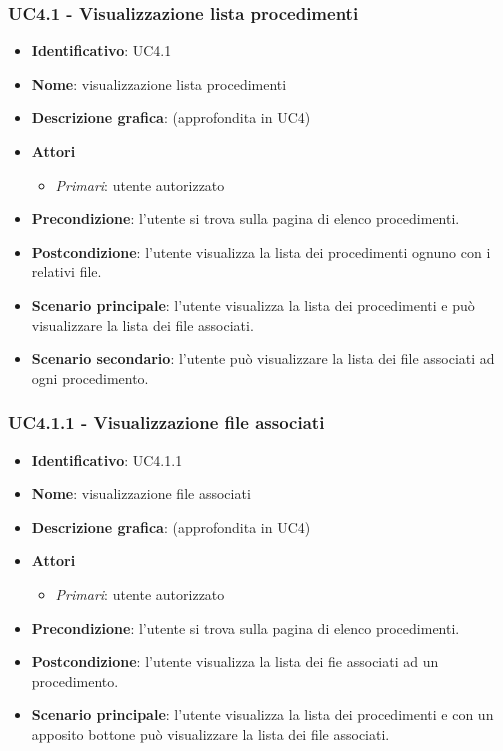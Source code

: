 \subsubsection{UC4.1 - Visualizzazione lista procedimenti}
\begin{itemize}
  \item \textbf{Identificativo}: UC4.1
  \item \textbf{Nome}: visualizzazione lista procedimenti
  \item \textbf{Descrizione grafica}: (approfondita in UC4)
  \item \textbf{Attori}
        \begin{itemize}
          \item \textit{Primari}: utente autorizzato
        \end{itemize}
  \item \textbf{Precondizione}: l'utente si trova sulla pagina di elenco procedimenti.
  \item \textbf{Postcondizione}: l'utente visualizza la lista dei procedimenti ognuno con i relativi file.
  \item \textbf{Scenario principale}: l'utente visualizza la lista dei procedimenti e può visualizzare la lista dei file associati.
  \item \textbf{Scenario secondario}: l'utente può visualizzare la lista dei file associati ad ogni procedimento.
\end{itemize}

\subsubsection{UC4.1.1 - Visualizzazione file associati}
\begin{itemize}
  \item \textbf{Identificativo}: UC4.1.1
  \item \textbf{Nome}: visualizzazione file associati
  \item \textbf{Descrizione grafica}: (approfondita in UC4)
  \item \textbf{Attori}
        \begin{itemize}
          \item \textit{Primari}: utente autorizzato
        \end{itemize}
  \item \textbf{Precondizione}: l'utente si trova sulla pagina di elenco procedimenti.
  \item \textbf{Postcondizione}: l'utente visualizza la lista dei fie associati ad un procedimento.
  \item \textbf{Scenario principale}: l'utente visualizza la lista dei procedimenti e con un apposito bottone può visualizzare la lista dei file associati.
\end{itemize}
\newpage